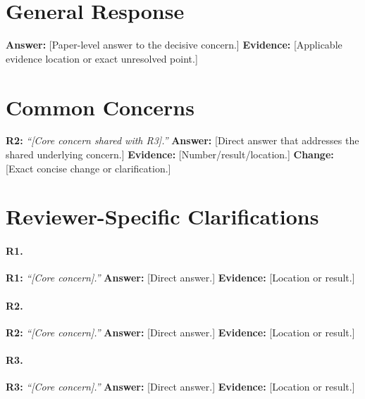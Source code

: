 \documentclass[10pt]{article}
\newcommand{\rlabel}[2]{\textbf{\textcolor{#1}{#2}}}
\newcommand{\quotedconcern}[3]{\noindent\textcolor{#1}{\textbf{#2:}} \emph{``#3''} }
\newcommand{\directanswer}[1]{\textbf{Answer:} #1 }
\newcommand{\evidence}[1]{\textbf{Evidence:} #1 }
\newcommand{\change}[1]{\textbf{Change:} #1\par}
\begin{document}
\section*{General Response}
\directanswer{[Paper-level answer to the decisive concern.]}
\evidence{[Applicable evidence location or exact unresolved point.]}

\section*{Common Concerns}
\quotedconcern{revtwo}{R2}{[Core concern shared with R3].}
\directanswer{[Direct answer that addresses the shared underlying concern.]}
\evidence{[Number/result/location.]}
\change{[Exact concise change or clarification.]}

\section*{Reviewer-Specific Clarifications}
\paragraph{\rlabel{revone}{R1}.}
\quotedconcern{revone}{R1}{[Core concern].}
\directanswer{[Direct answer.]}
\evidence{[Location or result.]}

\paragraph{\rlabel{revtwo}{R2}.}
\quotedconcern{revtwo}{R2}{[Core concern].}
\directanswer{[Direct answer.]}
\evidence{[Location or result.]}

\paragraph{\rlabel{revthree}{R3}.}
\quotedconcern{revthree}{R3}{[Core concern].}
\directanswer{[Direct answer.]}
\evidence{[Location or result.]}
\end{document}
